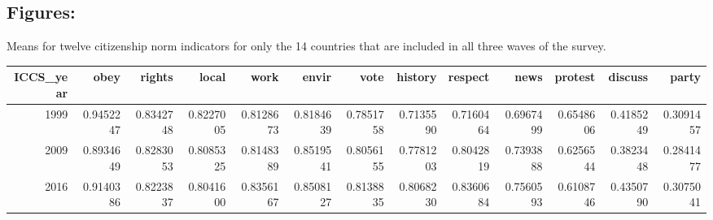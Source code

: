 \documentclass[]{article}
\newenvironment{Shaded}{\begin{snugshade}}{\end{snugshade}}
\newcommand{\DataTypeTok}[1]{\textcolor[rgb]{0.13,0.29,0.53}{#1}}
\newcommand{\DecValTok}[1]{\textcolor[rgb]{0.00,0.00,0.81}{#1}}
\newcommand{\KeywordTok}[1]{\textcolor[rgb]{0.13,0.29,0.53}{\textbf{#1}}}
\newcommand{\NormalTok}[1]{#1}
\newcommand{\OperatorTok}[1]{\textcolor[rgb]{0.81,0.36,0.00}{\textbf{#1}}}
\newcommand{\OtherTok}[1]{\textcolor[rgb]{0.56,0.35,0.01}{#1}}
\newcommand{\StringTok}[1]{\textcolor[rgb]{0.31,0.60,0.02}{#1}}
\begin{document}
\hypertarget{figures}{%
\subsection{Figures:}\label{figures}}

Means for twelve citizenship norm indicators for only the 14 countries
that are included in all three waves of the survey.

\begin{Shaded}
\end{Shaded}

\begin{longtable}[]{@{}rrrrrrrrrrrrr@{}}
\toprule
ICCS\_year & obey & rights & local & work & envir & vote & history &
respect & news & protest & discuss & party\tabularnewline
\midrule
\endhead
1999 & 0.9452247 & 0.8342748 & 0.8227005 & 0.8128673 & 0.8184639 &
0.7851758 & 0.7135590 & 0.7160464 & 0.6967499 & 0.6548606 & 0.4185249 &
0.3091457\tabularnewline
2009 & 0.8934649 & 0.8283053 & 0.8085325 & 0.8148389 & 0.8519541 &
0.8056155 & 0.7781203 & 0.8042819 & 0.7393888 & 0.6256544 & 0.3823448 &
0.2841477\tabularnewline
2016 & 0.9140386 & 0.8223837 & 0.8041600 & 0.8356167 & 0.8508127 &
0.8138835 & 0.8068230 & 0.8360684 & 0.7560593 & 0.6108746 & 0.4350790 &
0.3075041\tabularnewline
\bottomrule
\end{longtable}
\end{document}
